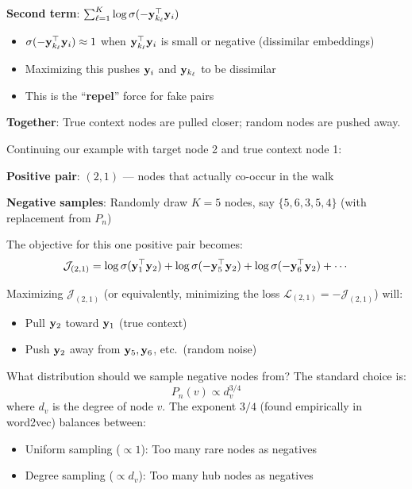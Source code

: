 \begin{notechapter}
\begin{intuition}
\textbf{Second term}: $\sum_{\ell=1}^{K} \log \sigma(-\mathbf{y}_{k_\ell}^\top \mathbf{y}_i)$
\begin{itemize}
    \item $\sigma(-\mathbf{y}_{k_\ell}^\top \mathbf{y}_i) \approx 1$ when $\mathbf{y}_{k_\ell}^\top \mathbf{y}_i$ is small or negative (dissimilar embeddings)
    \item Maximizing this pushes $\mathbf{y}_i$ and $\mathbf{y}_{k_\ell}$ to be dissimilar
    \item This is the ``\textbf{repel}'' force for fake pairs
\end{itemize}

\textbf{Together}: True context nodes are pulled closer; random nodes are pushed away.
\end{intuition}

\begin{example}
Continuing our example with target node 2 and true context node 1:

\textbf{Positive pair}: $(2, 1)$ --- nodes that actually co-occur in the walk

\textbf{Negative samples}: Randomly draw $K=5$ nodes, say $\{5, 6, 3, 5, 4\}$ (with replacement from $P_n$)

The objective for this one positive pair becomes:
\[
\mathcal{J}_{(2,1)} = \log \sigma(\mathbf{y}_1^\top \mathbf{y}_2) + \log \sigma(-\mathbf{y}_5^\top \mathbf{y}_2) + \log \sigma(-\mathbf{y}_6^\top \mathbf{y}_2) + \cdots
\]

Maximizing $\mathcal{J}_{(2,1)}$ (or equivalently, minimizing the loss $\mathcal{L}_{(2,1)} = -\mathcal{J}_{(2,1)}$) will:
\begin{itemize}
    \item Pull $\mathbf{y}_2$ toward $\mathbf{y}_1$ (true context)
    \item Push $\mathbf{y}_2$ away from $\mathbf{y}_5, \mathbf{y}_6$, etc.\ (random noise)
\end{itemize}
\end{example}

\begin{remark}
What distribution should we sample negative nodes from? The standard choice is:
\[
P_n(v) \propto d_v^{3/4}
\]
where $d_v$ is the degree of node $v$. The exponent $3/4$ (found empirically in word2vec) balances between:
\begin{itemize}
    \item Uniform sampling ($\propto 1$): Too many rare nodes as negatives
    \item Degree sampling ($\propto d_v$): Too many hub nodes as negatives
\end{itemize}
\end{remark}


\end{notechapter}
